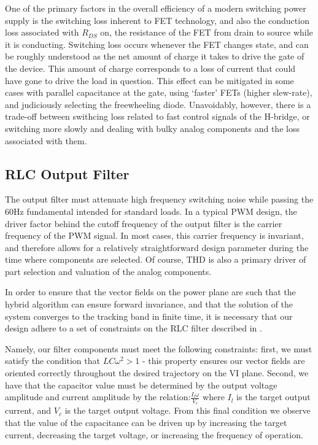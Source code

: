 One of the primary factors in the overall efficiency of a modern switching power supply is the switching loss inherent to FET technology, and also the conduction loss associated with $R_{DS}$ on, the resistance of the FET from drain to source while it is conducting. Switching loss occurs whenever the FET changes state, and can be roughly understood as the net amount of charge it takes to drive the gate of the device. This amount of charge corresponds to a loss of current that could have gone to drive the load in question. This effect can be mitigated in some cases with parallel capacitance at the gate, using `faster' FETs (higher slew-rate), and judiciously selecting the freewheeling diode\cite{switchingLoss}. Unavoidably, however, there is a trade-off between swithcing loss related to fast control signals of the H-bridge, or switching more slowly and dealing with bulky analog components and the loss associated with them.  
  
\subsection{RLC Output Filter}
The output filter must attenuate high frequency switching noise while passing the 60Hz fundamental intended for standard loads. In a typical PWM design, the driver factor behind the cutoff frequency of the output filter is the carrier frequency of the PWM signal. In most cases, this carrier frequency is invariant, and therefore allows for a relatively straightforward design parameter during the time where components are selected. Of course, THD is also a primary driver of part selection and valuation of the analog components.

In order to ensure that the vector fields on the power plane are such that the hybrid algorithm can ensure forward invariance, and that the solution of the system converges to the tracking band in finite time, it is necessary that our design adhere to a set of constraints on the RLC filter described in \cite{ricardo}. 

Namely, our filter components must meet the following constraints: first, we must satisfy the condition that $LC\omega^2>1$ - this property ensures our vector fields are oriented correctly throughout the desired trajectory on the VI plane. Second, we have that the capacitor value must be determined by the output voltage amplitude and current amplitude by the relation:$\frac{I_l\omega}{V_c}$ where $I_l$ is the target output current, and $V_c$ is the target output voltage. From this final condition we observe that the value of the capacitance can be driven up by increasing the target current, decreasing the target voltage, or increasing the frequency of operation. 

